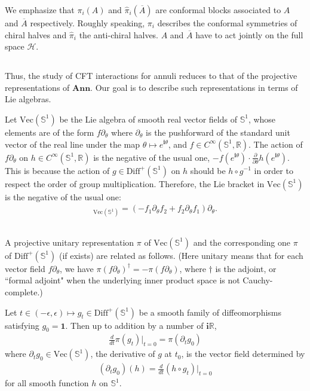 \documentclass[11pt,b5paper,notitlepage]{article}
\theoremstyle{definition}
\theoremstyle{plain}
\newcommand{\mc}{\mathcal}
\newcommand{\wht}{\widehat}
\newcommand{\ovl}{\overline}
\newcommand{\id}{\mathbf{1}}
\newcommand{\Diffp}{\mathrm{Diff}^+}
\newcommand{\Vect}{\mathrm{Vec}}
\newcommand{\im}{\mathbf{i}}
\newcommand{\Rbb}{\mathbb R}
\newcommand{\Sbb}{{\mathbb S}}
\newcommand{\Ann}{\mathbf{Ann}}
\numberwithin{equation}{section}
\begin{document}
We emphasize that $\pi_i(A)$ and $\wht\pi_i(\ovl A)$ are conformal blocks associated to $A$ and $\ovl A$ respectively.  Roughly speaking, $\pi_i$ describes the conformal symmetries of chiral halves and $\wht\pi_i$ the anti-chiral halves. $A$ and $\ovl A$ have to act jointly on the full space $\mc H$.



\subsection{}

Thus, the study of CFT interactions for annuli reduces to that of the projective representations of $\Ann$. Our goal is to describe such representations in terms of Lie algebras. 

Let $\Vect(\Sbb^1)$ be the Lie algebra of smooth real vector fields of $\Sbb^1$, whose elements are of the form $f\partial_\theta$ where $\partial_\theta$ is the pushforward of the standard unit vector of the real line under the map $\theta\mapsto e^{\im\theta}$, and $f\in C^\infty(\Sbb^1,\Rbb)$. The action of  $f\partial_\theta$ on $h\in C^\infty(\Sbb^1,\Rbb)$ is the negative of the usual one, $-f(e^{\im\theta})\cdot \frac\partial{\partial\theta}h(e^{\im\theta})$. This is because the action of $g\in\Diffp(\Sbb^1)$ on $h$ should be $h\circ g^{-1}$ in order to respect the order of group multiplication. Therefore, the Lie bracket in $\Vect(\Sbb^1)$ is the negative of the usual one:
\begin{align}
[f_1\partial_\theta,f_2\partial_\theta]_{\Vect(\Sbb^1)}=(-f_1\partial_\theta f_2+f_2\partial_\theta f_1)\partial_\theta.	
\end{align}


\subsection{}\label{lb8}


A projective unitary representation $\pi$ of $\Vect(\Sbb^1)$ and the corresponding one $\pi$ of $\Diffp(\Sbb^1)$ (if exists) are related as follows. (Here unitary means that for each vector field $f\partial_\theta$, we have $\pi(f\partial_\theta)^\dagger=-\pi(f\partial_\theta)$, where $\dagger$ is the adjoint, or ``formal adjoint" when the underlying inner product space is not Cauchy-complete.) 

Let $t\in(-\epsilon,\epsilon)\mapsto g_t\in\Diffp(\Sbb^1)$ be a smooth family of diffeomorphisms satisfying $g_0=\id$. Then up to addition by a number of $\im\Rbb$, 
\begin{align}
\frac d{dt}\pi(g_t)\Big|_{t=0}=\pi(\partial_t g_0)	\label{eq5}
\end{align}
where $\partial_t g_0\in\Vect(\Sbb^1)$, the derivative of $g$ at $t_0$, is the vector field determined by
\begin{align}
(\partial_t g_0)(h)=\frac d{dt}(h\circ g_t)\Big|_{t=0}\label{eq4}
\end{align}
for all smooth function $h$ on $\Sbb^1$.
\end{document}
